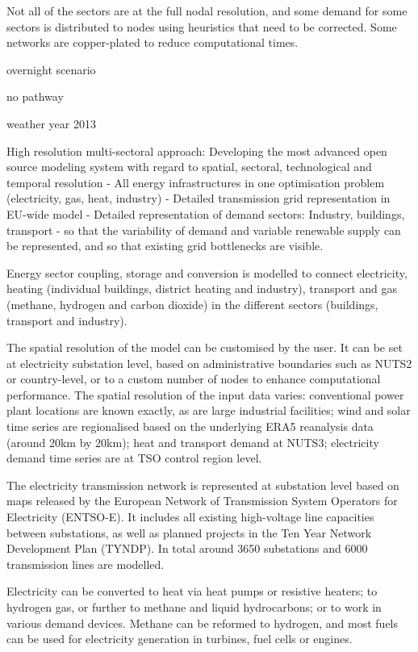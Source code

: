 Not all of the sectors are at the full nodal resolution, and some demand for
some sectors is distributed to nodes using heuristics that need to be corrected.
Some networks are copper-plated to reduce computational times.

overnight scenario

no pathway

weather year 2013

High resolution multi-sectoral approach: Developing the most advanced open source modeling system with regard to spatial, sectoral, technological and temporal resolution
- All energy infrastructures in one optimisation problem (electricity, gas, heat, industry)
- Detailed transmission grid representation in EU-wide model
- Detailed representation of demand sectors: Industry, buildings, transport
- so that the variability of demand and variable renewable supply can be represented, and so that existing grid bottlenecks are visible.

Energy sector coupling, storage and conversion is modelled to connect
electricity, heating (individual buildings, district heating and industry),
transport and gas (methane, hydrogen and carbon dioxide) in the different
sectors (buildings, transport and industry).

The spatial resolution of the model can be customised by the user. It can be set
at electricity substation level, based on administrative boundaries such as
NUTS2 or country-level, or to a custom number of nodes to enhance computational
performance. The spatial resolution of the input data varies: conventional power
plant locations are known exactly, as are large industrial facilities; wind and
solar time series are regionalised based on the underlying ERA5 reanalysis data
(around 20km by 20km); heat and transport demand at NUTS3; electricity demand
time series are at TSO control region level.

The electricity transmission
network is represented at substation level based on maps released by the
European Network of Transmission System Operators for Electricity (ENTSO-E). It
includes all existing high-voltage line capacities between substations, as well
as planned projects in the Ten Year Network Development Plan (TYNDP). In total
around 3650 substations and 6000 transmission lines are modelled.

Electricity can be converted to heat via heat pumps or resistive heaters; to
hydrogen gas, or further to methane and liquid hydrocarbons; or to work in
various demand devices. Methane can be reformed to hydrogen, and most fuels can
be used for electricity generation in turbines, fuel cells or engines.


